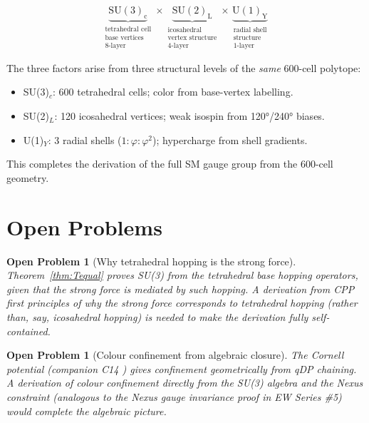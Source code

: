 \documentclass[11pt,a4paper]{article}
\newtheorem{openprob}[theorem]{Open Problem}
\newcommand{\phig}{\varphi}
\begin{document}
\begin{equation}
\underbrace{\mathrm{SU(3)_c}}_{\substack{\text{tetrahedral cell}\\\text{base vertices}\\\text{8-layer}}}
\times
\underbrace{\mathrm{SU(2)_L}}_{\substack{\text{icosahedral}\\\text{vertex structure}\\\text{4-layer}}}
\times
\underbrace{\mathrm{U(1)_Y}}_{\substack{\text{radial shell}\\\text{structure}\\\text{1-layer}}}
\label{eq:SM_gauge}
\end{equation}

The three factors arise from three structural levels of the
\emph{same} 600-cell polytope:
\begin{itemize}
\item SU(3)$_c$: 600 tetrahedral cells; color from base-vertex labelling.
\item SU(2)$_L$: 120 icosahedral vertices; weak isospin from 120°/240° biases.
\item U(1)$_Y$: 3 radial shells ($1:\phig:\phig^2$); hypercharge from shell gradients.
\end{itemize}

This completes the derivation of the full SM gauge group from the
600-cell geometry.

\section{Open Problems}

\begin{openprob}[Why tetrahedral hopping is the strong force]
\label{op:strong_primitive}
Theorem~\ref{thm:Tequal} proves SU(3) from the tetrahedral base
hopping operators, given that the strong force is mediated by
such hopping.  A derivation from CPP first principles of
\emph{why} the strong force corresponds to tetrahedral hopping
(rather than, say, icosahedral hopping) is needed to make the
derivation fully self-contained.
\end{openprob}

\begin{openprob}[Colour confinement from algebraic closure]
\label{op:confinement_algebra}
The Cornell potential (companion C14 \citep{c14}) gives
confinement geometrically from qDP chaining.  A derivation of
colour confinement directly from the SU(3) algebra and the Nexus
constraint (analogous to the Nexus gauge invariance proof in EW
Series \#5) would complete the algebraic picture.
\end{openprob}
\end{document}
